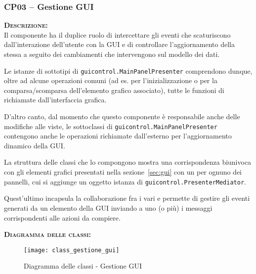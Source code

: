 \subsubsection{CP03 -- Gestione GUI}
\begin{description}
	\item{\scshape\bfseries Descrizione:}\\
Il componente ha il duplice ruolo di intercettare gli eventi che scaturiscono dall'interazione dell'utente con la GUI e di controllare l'aggiornamento della stessa a seguito dei cambiamenti che intervengono sul modello dei dati.

Le istanze di sottotipi di \texttt{guicontrol.MainPanelPresenter} comprendono dunque, oltre ad alcune operazioni comuni (ad es. per l'inizializzazione o per la comparsa/scomparsa dell'elemento grafico associato), tutte le funzioni di  richiamate dall'interfaccia grafica.

D'altro canto, dal momento che questo componente è responsabile anche delle modifiche alle viste, le sottoclassi di \texttt{guicontrol.MainPanelPresenter} contengono anche le operazioni richiamate dall'esterno per l'aggiornamento dinamico della GUI\@.

La struttura delle classi che lo compongono mostra una corrispondenza biunivoca con gli elementi grafici presentati nella sezione~\ref{sec:gui} con un  per ognuno dei pannelli, cui si aggiunge un oggetto istanza di \texttt{guicontrol.PresenterMediator}.

Quest'ultimo incapsula la collaborazione fra i vari  e permette di gestire gli eventi generati da un elemento della GUI inviando a uno (o più)  i messaggi corrispondenti alle azioni da compiere.

	\item{\scshape\bfseries Diagramma delle classi:}\\
  \begin{figure}[H]
    \centering
    \texttt{[image: class\_gestione\_gui]}
    \caption{Diagramma delle classi - Gestione GUI}\label{fig:gestionegui}
  \end{figure}


\end{description}
